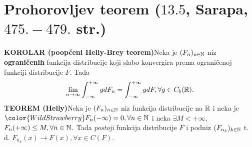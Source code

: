 \documentclass{article}
\begin{document}
\section{Prohorovljev teorem (\textsection \(13.5\), Sarapa, \(475.-479.\) str.)}
\textbf{KOROLAR (poopćeni Helly-Brey teorem)}\newline Neka je \((F_n)_{n\in\Bbb N}\) niz \textbf{ograničenih} funkcija distribucije koji slabo konvergira prema ograničenoj funkciji distribucije \(F.\) Tada \[\lim_{n\to\infty}\int_{-\infty}^{+\infty}g
dF_n=\int_{-\infty}^{+\infty}gdF,\forall g\in C_b(\Bbb R).\]  
\textbf{TEOREM (Helly)}\newline Neka je \((F_n)_{n\in\Bbb N}\) niz funkcija distribucije na \(\Bbb R\) i neka je \(\color{WildStrawberry}F_n(-\infty)=0,\forall n\in\Bbb N\) i neka \(\exists M<+\infty,\)\newline \(F_n(+\infty)\le M,\forall n\in\Bbb N.\) Tada \emph{postoji} funkcija distribucije \(F\) i podniz \((F_{n_k})_{k\in\Bbb N}\) t. d. \(F_{n_k}(x)\to F(x),\forall x\in C(F).\)\newline\newline
\end{document}
